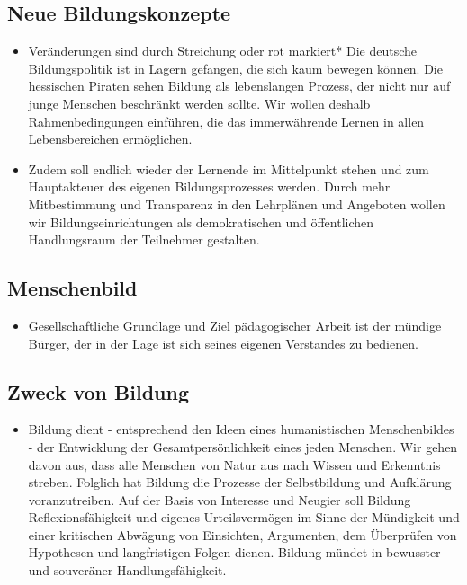 \documentclass[10pt,a4paper,twocolumn,twoside,titlepage]{article}
\begin{document}
\subsection{Neue Bildungskonzepte}
\begin{itemize}
\item Veränderungen sind durch Streichung oder rot markiert* Die deutsche Bildungspolitik ist in Lagern gefangen, die sich kaum bewegen können. Die hessischen Piraten sehen Bildung als lebenslangen Prozess, der nicht nur auf junge Menschen beschränkt werden sollte. Wir wollen deshalb Rahmenbedingungen einführen, die das immerwährende Lernen in allen Lebensbereichen ermöglichen.
\item Zudem soll endlich wieder der Lernende im Mittelpunkt stehen und zum Hauptakteuer des eigenen Bildungsprozesses werden. Durch mehr Mitbestimmung und Transparenz in den Lehrplänen und Angeboten wollen wir Bildungseinrichtungen als demokratischen und öffentlichen Handlungsraum der Teilnehmer gestalten.
\end{itemize}

\subsection{Menschenbild}
\begin{itemize}
\item Gesellschaftliche Grundlage und Ziel pädagogischer Arbeit ist der mündige Bürger, der in der Lage ist sich seines eigenen Verstandes zu bedienen.
\end{itemize}

\subsection{Zweck von Bildung}
\begin{itemize}
\item Bildung dient - entsprechend den Ideen eines humanistischen Menschenbildes - der Entwicklung der Gesamtpersönlichkeit eines jeden Menschen. Wir gehen davon aus, dass alle Menschen von Natur aus nach Wissen und Erkenntnis streben. Folglich hat Bildung die Prozesse der Selbstbildung und Aufklärung voranzutreiben. Auf der Basis von Interesse und Neugier soll Bildung Reflexionsfähigkeit und eigenes Urteilsvermögen im Sinne der Mündigkeit und einer kritischen Abwägung von Einsichten, Argumenten, dem Überprüfen von Hypothesen und langfristigen Folgen dienen.
Bildung mündet in bewusster und souveräner Handlungsfähigkeit.
\end{itemize}
\end{document}
